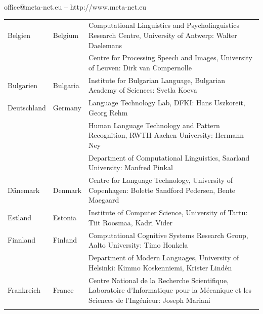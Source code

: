 \documentclass[]{../../metanetpaper}
\begin{document}
\vfill
\centerline{office@meta-net.eu -- http://www.meta-net.eu}

\cleardoublepage

\appendix
{}

%

  
\cleardoublepage

\label{metanetmembers}

\small

\begin{longtable}{@{}llp{113mm}@{}}
  Belgien & \textcolor{grey1}{Belgium} & Computational Linguistics and Psycholinguistics Research Centre, University of Antwerp: Walter Daelemans\\ \addlinespace
  & & Centre for Processing Speech and Images, University of Leuven: Dirk van Compernolle \\ \addlinespace
  Bulgarien & \textcolor{grey1}{Bulgaria} & Institute for Bulgarian Language, Bulgarian Academy of Sciences: Svetla Koeva \\ \addlinespace
  Deutschland & \textcolor{grey1}{Germany} & Language Technology Lab, DFKI: Hans Uszkoreit, Georg Rehm\\ \addlinespace
  & & Human Language Technology and Pattern Recognition, RWTH Aachen University: Hermann Ney \\ \addlinespace
  & & Department of Computational Linguistics, Saarland University: Manfred Pinkal\\ \addlinespace Dänemark &  \textcolor{grey1}{Denmark} & Centre for Language Technology, University of Copenhagen: \newline Bolette Sandford Pedersen, Bente Maegaard\\ \addlinespace
  Estland & \textcolor{grey1}{Estonia} & Institute of Computer Science, University of Tartu: Tiit Roosmaa, Kadri Vider\\ \addlinespace
  Finnland & \textcolor{grey1}{Finland} & Computational Cognitive Systems Research Group, Aalto University: Timo Honkela\\ \addlinespace
  & & Department of Modern Languages, University of Helsinki: Kimmo Koskenniemi, Krister Lindén \\ \addlinespace
  Frankreich & \textcolor{grey1}{France} & Centre National de la Recherche Scientifique, Laboratoire d'Informatique pour la Mécanique et les Sciences de l'Ingénieur: Joseph Mariani \\ \addlinespace

\end{longtable}
\end{document}

